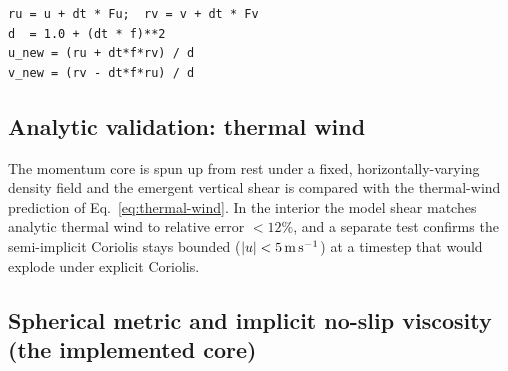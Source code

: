 \begin{lstlisting}[caption={Semi-implicit Coriolis: the $1+(\Delta t f)^2$ denominator makes it stable for any timestep.}]
ru = u + dt * Fu;  rv = v + dt * Fv
d  = 1.0 + (dt * f)**2
u_new = (ru + dt*f*rv) / d
v_new = (rv - dt*f*ru) / d
\end{lstlisting}

\subsection*{Analytic validation: thermal wind}

The momentum core is spun up from rest under a fixed, horizontally-varying density field and the
emergent vertical shear is compared with the thermal-wind prediction of Eq.~\eqref{eq:thermal-wind}.
In the interior the model shear matches analytic thermal wind to relative error $<12\%$, and a
separate test confirms the semi-implicit Coriolis stays bounded ($|u|<5\,\mathrm{m\,s^{-1}}$) at a
timestep that would explode under explicit Coriolis.

\subsection*{Spherical metric and implicit no-slip viscosity (the implemented core)}

